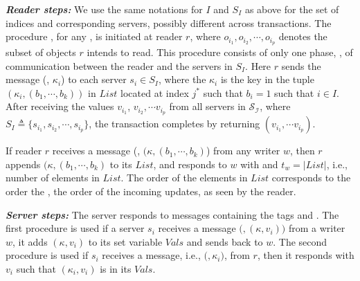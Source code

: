 \textit{\textbf{Reader steps:}}  
We use the same notations for $I$ and $S_I$ as above for the set of indices and corresponding servers, possibly 
different across transactions.
The procedure  , 
for any  \rot{}, 
is  initiated at  reader  $r$, where   $o_{i_1},  o_{i_2}, \cdots, o_{i_p}$  denotes the  subset  of  
objects $r$ 
intends to read. This procedure
consists of only one phase,  {\readValue},  of communication 
between the reader and the servers in $S_I$.   Here $r$ sends  the message
(\readValueTag, ${\kappa}_i$) to each server $s_i \in S_I$, where 
the ${\kappa}_i$ is the key in  the tuple $({\kappa}_{i}, (b_{1}, \cdots, b_{k}))$  in  $List$ located at  index $j^*$ such that $b_i =1$ such that 
$i \in I$. %
After
receiving the values $v_{i_1}$, $v_{i_2}, \cdots v_{i_p}$ from all  servers in $\mathcal{S_I}$,  where $S_I \triangleq \{s_{i_1},  s_{i_2}, \cdots, s_{i_p}\}$, the transaction completes by 
returning $(v_{i_1}, \cdots v_{i_p})$.

If  reader $r$ receives a message  
(\informReaderTag, $({\kappa}, (b_{1}, \cdots, b_{k})$) from any writer $w$, then $r$ appends  
$({\kappa}, (b_{1}, \cdots, b_{k})$ to its  $List$,  and responds to $w$ with  
{\ackTag} and $t_w = |List|$, i.e., number of elements in $List$.
The order of the  elements in  $List$ corresponds to  the order  
the \wots{}, the order of the incoming  {\informReaderTag} updates,  as seen by the reader.


\textit{\textbf{Server steps:}} The server responds to messages containing the tags 
{\writeValueTag} and \readValueTag.  The first procedure is used if a server $s_i$ receives a 
message  $(${\writeValueTag}$, ({\kappa}, v_{i}))$  from a writer $w$,  it  adds $({\kappa}, v_i)$ to its set variable   $Vals$ and sends {\ackTag} back to $w$.
The second procedure is used  if  $s_i$ receives a message, i.e., $(${\readValueTag}$, {\kappa}_{i})$, from $r$, then it responds with $v_i$ such that $({\kappa}_{i}, v_i)$ is in its $Vals$.

